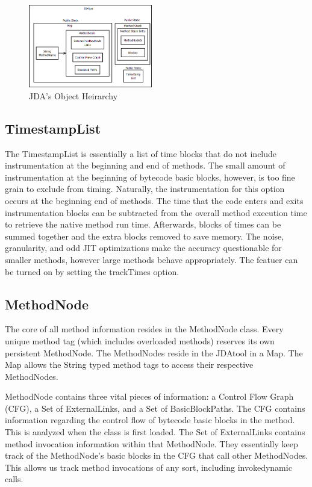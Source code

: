 \documentclass[conference,10pt,twocolumn]{./IEEE/IEEEtran}
\begin{document}
\begin{figure}[t]
  \includegraphics[width=0.48\textwidth]{JDAtool.png}
  \caption{JDA's Object Heirarchy}
  \label{fig:JDAtool}
\end{figure}

\subsection{TimestampList}
The TimestampList is essentially a list of time blocks that do not include instrumentation at the beginning and end of methods.
The small amount of instrumentation at the beginning of bytecode basic blocks, however, is too fine grain to exclude from timing.
Naturally, the instrumentation for this option occurs at the beginning end of methods.
The time that the code enters and exits instrumentation blocks can be subtracted from the overall method execution time to retrieve the native method run time.
Afterwards, blocks of times can be summed together and the extra blocks removed to save memory.
The noise, granularity, and odd JIT optimizations make the accuracy questionable for smaller methods, however large methods behave appropriately.
The featuer can be turned on by setting the trackTimes option.

\subsection{MethodNode}
The core of all method information resides in the MethodNode class.
Every unique method tag (which includes overloaded methods) reserves its own persistent MethodNode.
The MethodNodes reside in the JDAtool in a Map.
The Map allows the String typed method tags to access their respective MethodNodes.

MethodNode contains three vital pieces of information: a Control Flow Graph (CFG), a Set of ExternalLinks, and a Set of BasicBlockPaths.
The CFG contains information regarding the control flow of bytecode basic blocks in the method.
This is analyzed when the class is first loaded.
The Set of ExternalLinks contains method invocation information within that MethodNode.
They essentially keep track of the MethodNode’s basic blocks in the CFG that call other MethodNodes.
This allows us track method invocations of any sort, including invokedynamic calls.
\end{document}
